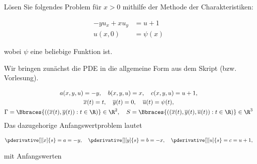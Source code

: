 \begin{exercise}

Lösen Sie folgendes Problem für $x > 0$ mithilfe der Methode der Charakteristiken:

\begin{align*}
    -y u_x + x u_y
    & =
    u + 1 \\
    u(x, 0)
    & =
    \psi(x)
\end{align*}

wobei $\psi$ eine beliebige Funktion ist.

\end{exercise}

\begin{solution}
	Wir bringen zunächst die PDE in die allgemeine Form aus dem Skript (bzw. Vorlesung).

	\begin{gather*}
	a(x, y, u) = -y,
	\quad
	b(x, y, u) = x,
	\quad
	c(x, y, u) = u + 1, \\
	\overline{x}(t) = t,
	\quad
	\overline{y}(t) = 0,
	\quad
	\overline{u}(t) = \psi(t), \\
	\Gamma = \Bbraces
	{
		(
		(
		\overline{x}(t),
		\overline{y}(t)
		):
		t \in \R
		)
	} \in \R^2,
	\quad
	S = \Bbraces
	{
		(
		(
		\overline{x}(t),
		\overline{y}(t),
		\overline{u}(t)
		):
		t \in \R
		)
	} \in \R^3
	\end{gather*}
	Das dazugehorige Anfangswertproblem lautet

	\begin{align*}
	\pderivative[][x]{s} = a = -y, \quad
	\pderivative[][y]{s} = b = -x, \quad
	\pderivative[][u]{s} = c = u + 1,
	\end{align*}

	mit Anfangswerten


\end{solution}
